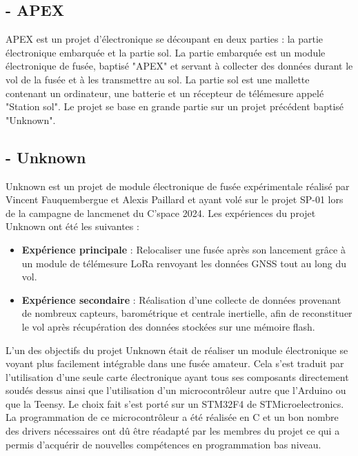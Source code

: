 \documentclass{article}
\begin{document}
\subsection*{- APEX}
APEX est un projet d'électronique se découpant en deux parties : la partie
électronique embarquée et la partie sol. La partie embarquée est un module
électronique de fusée, baptisé "APEX" et servant à collecter des données durant le
vol de la fusée et à les transmettre au sol. La partie sol est une mallette
contenant un ordinateur, une batterie et un récepteur de télémesure appelé
"Station sol". Le projet se base en grande partie sur un projet précédent
baptisé "Unknown".

\subsection*{- Unknown}
Unknown est un projet de module électronique de fusée expérimentale réalisé par
Vincent Fauquembergue et Alexis Paillard et ayant volé sur le projet SP-01 lors de la
campagne de lancmenet du C'space 2024. Les expériences du projet Unknown ont été
les suivantes :
\begin{itemize}
    \item \textbf{Expérience principale} : Relocaliser une fusée après son lancement
    grâce à un module de télémesure LoRa renvoyant les données GNSS tout au long du
    vol.
    \item \textbf{Expérience secondaire} : Réalisation d'une collecte de données
    provenant de nombreux capteurs, barométrique et centrale inertielle, afin de
    reconstituer le vol après récupération des données stockées sur une mémoire
    flash.
\end{itemize}
L'un des objectifs du projet Unknown était de réaliser un module électronique se
voyant plus facilement intégrable dans une fusée amateur. Cela s'est traduit par
l'utilisation d'une seule carte électronique ayant tous ses composants directement
soudés dessus ainsi que l'utilisation d'un microcontrôleur autre que l'Arduino ou
que la Teensy. Le choix fait s'est porté sur un STM32F4 de STMicroelectronics. La
programmation de ce microcontrôleur a été réalisée en C et un bon nombre des
drivers nécessaires ont dû être réadapté par les membres du projet ce qui a permis
d'acquérir de nouvelles compétences en programmation bas niveau.
\end{document}
